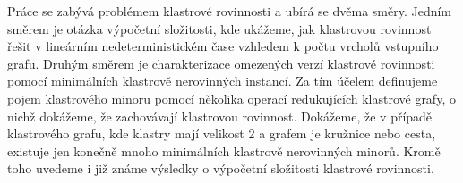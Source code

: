 Práce se zabývá problémem klastrové rovinnosti a ubírá se dvěma směry. Jedním směrem je otázka výpočetní složitosti, kde ukážeme, jak klastrovou rovinnost řešit v lineárním nedeterministickém čase vzhledem k počtu vrcholů vstupního grafu. Druhým směrem je charakterizace omezených verzí klastrové rovinnosti pomocí minimálních klastrově nerovinných instancí. Za tím účelem definujeme pojem klastrového minoru pomocí několika operací redukujících klastrové grafy, o nichž dokážeme, že zachovávají klastrovou rovinnost. Dokážeme, že v případě klastrového grafu, kde klastry mají velikost 2 a grafem je kružnice nebo cesta, existuje jen konečně mnoho minimálních klastrově nerovinných minorů. Kromě toho uvedeme i již známe výsledky o výpočetní složitosti klastrové rovinnosti.